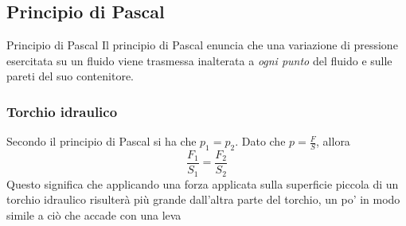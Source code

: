 \subsection{Principio di Pascal}
\begin{teorema}{Principio di Pascal}
	Il principio di Pascal enuncia che una variazione di pressione esercitata su un fluido viene trasmessa inalterata a \textit{ogni punto} del fluido e sulle pareti del suo contenitore.
\end{teorema}
\subsubsection{Torchio idraulico}
\begin{center}
\end{center}
Secondo il principio di Pascal si ha che $ p_1  = p_2 $. Dato che $ p = \frac{F}{S} $, allora
\[
	\frac{F_1}{S_1} = \frac{F_2}{S_2}
\]
Questo significa che applicando una forza applicata sulla superficie piccola di un torchio idraulico risulterà più grande dall'altra parte del torchio, un po' in modo simile a ciò che accade con una leva

